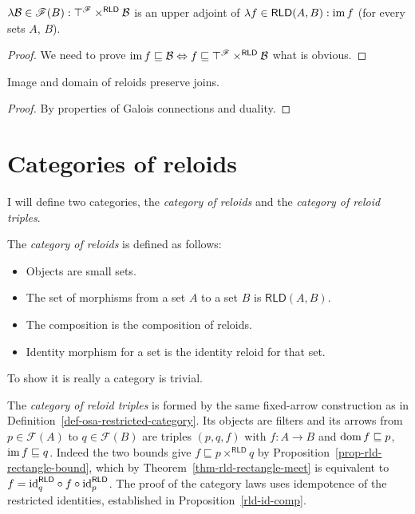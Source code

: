 \begin{lem}
$\lambda\mathcal{B}\in\mathscr{F}(B):\top^{\mathscr{F}}\times^{\mathsf{RLD}}\mathcal{B}$
is an upper adjoint of $\lambda f\in\mathsf{RLD}(A,B):\operatorname{im} f$ (for
every sets $A$, $B$).\end{lem}
\begin{proof}
We need to prove $\operatorname{im} f\sqsubseteq\mathcal{B}\Leftrightarrow f\sqsubseteq\top^{\mathscr{F}}\times^{\mathsf{RLD}}\mathcal{B}$
what is obvious.\end{proof}
\begin{cor}
\label{rld-dom-join}Image and domain of reloids preserve joins.\end{cor}
\begin{proof}
By properties of Galois connections and duality.
\end{proof}

\section{Categories of reloids}

I will define two categories, the \emph{category of reloids} and the
\emph{category of reloid triples}.

The \emph{category of reloids} is defined
as follows:
\begin{itemize}
\item Objects are small sets.
\item The set of morphisms from a set $A$ to a set $B$ is $\mathsf{RLD}(A,B)$.
\item The composition is the composition of reloids.
\item Identity morphism for a set is the identity reloid for that set.
\end{itemize}
To show it is really a category is trivial.

The \emph{category of reloid
triples} is formed by the same fixed-arrow construction as in
Definition~\ref{def-osa-restricted-category}. Its objects are filters
and its arrows from $p\in\mathscr F(A)$ to $q\in\mathscr F(B)$ are
triples $(p,q,f)$ with $f:A\to B$ and
$\operatorname{dom} f\sqsubseteq p$, $\operatorname{im} f\sqsubseteq q$. Indeed the two bounds
give $f\sqsubseteq p\times^{\mathsf{RLD}}q$ by
Proposition~\ref{prop-rld-rectangle-bound}, which by
Theorem~\ref{thm-rld-rectangle-meet} is equivalent to
$f={\operatorname{id}}_q^{\mathsf{RLD}}\circ f\circ{\operatorname{id}}_p^{\mathsf{RLD}}$.
The proof of the category laws uses idempotence of the restricted
identities, established in Proposition~\ref{rld-id-comp}.

